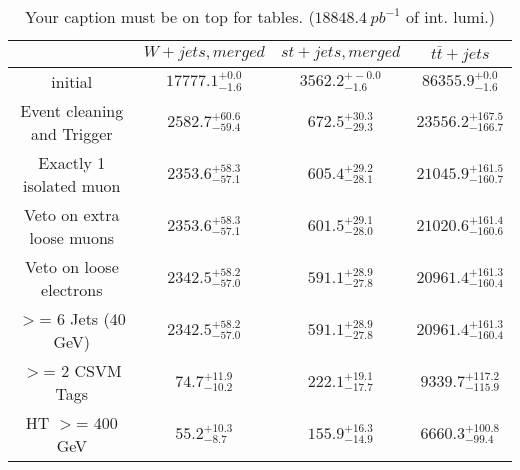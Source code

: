 \documentclass{article}
\begin{document}
\begin{table}
\caption{Your caption must be on top for tables. ($18848.4~pb^{-1}$ of int. lumi.)}
\label{tab:}
\centering
\begin{tabular}{|c|ccc|}
\toprule
&$W+jets, merged$	&$st+jets, merged$	&$t\bar{t}+jets$	\\

\midrule
initial&	$17777.1^{+0.0}_{-1.6}$	&$3562.2^{+-0.0}_{-1.6}$	&$86355.9^{+0.0}_{-1.6}$	\\

Event cleaning and Trigger&	$2582.7^{+60.6}_{-59.4}$	&$672.5^{+30.3}_{-29.3}$	&$23556.2^{+167.5}_{-166.7}$	\\

Exactly 1 isolated muon&	$2353.6^{+58.3}_{-57.1}$	&$605.4^{+29.2}_{-28.1}$	&$21045.9^{+161.5}_{-160.7}$	\\

Veto on extra loose muons&	$2353.6^{+58.3}_{-57.1}$	&$601.5^{+29.1}_{-28.0}$	&$21020.6^{+161.4}_{-160.6}$	\\

Veto on loose electrons&	$2342.5^{+58.2}_{-57.0}$	&$591.1^{+28.9}_{-27.8}$	&$20961.4^{+161.3}_{-160.4}$	\\

$>$= 6 Jets (40 GeV)&	$2342.5^{+58.2}_{-57.0}$	&$591.1^{+28.9}_{-27.8}$	&$20961.4^{+161.3}_{-160.4}$	\\

$>$= 2 CSVM Tags&	$74.7^{+11.9}_{-10.2}$	&$222.1^{+19.1}_{-17.7}$	&$9339.7^{+117.2}_{-115.9}$	\\

HT $>$=  400 GeV&	$55.2^{+10.3}_{-8.7}$	&$155.9^{+16.3}_{-14.9}$	&$6660.3^{+100.8}_{-99.4}$	\\

\bottomrule
\end{tabular}
\end{table}
\end{document}
